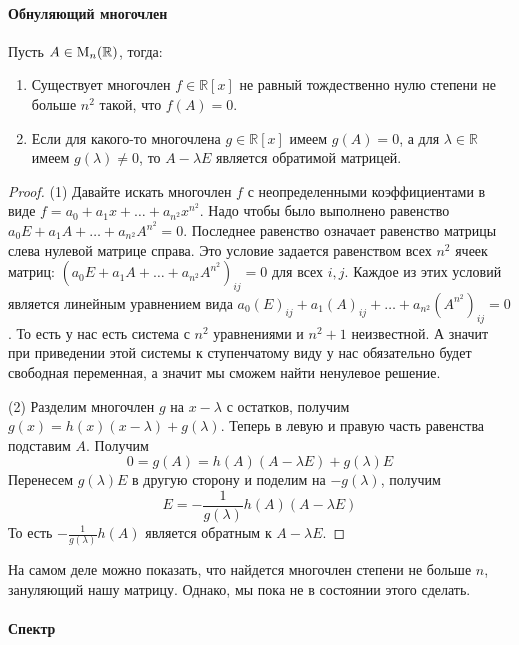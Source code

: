\paragraph{Обнуляющий многочлен}


\begin{claim}\label{claim::PolyAnnihilator}
Пусть $A\in\operatorname{M}_{n}(\mathbb R)$, тогда:
\begin{enumerate}
\item Существует многочлен $f\in\mathbb R[x]$ не равный тождественно нулю степени не больше $n^2$ такой, что $f(A) = 0$.
\item Если для какого-то многочлена $g\in\mathbb R[x]$ имеем $g(A) = 0$, а для $\lambda\in\mathbb R$ имеем $g(\lambda)\neq 0$, то $A-\lambda E$ является обратимой матрицей.
\end{enumerate}
\end{claim}
\begin{proof}
(1) Давайте искать многочлен $f$ с неопределенными коэффициентами в виде $f = a_0 + a_1 x + \ldots + a_{n^2}x^{n^2}$. Надо чтобы было выполнено равенство $a_0 E + a_1 A + \ldots + a_{n^2}A^{n^2} = 0$. Последнее равенство означает равенство матрицы слева нулевой матрице справа. Это условие задается равенством всех $n^2$ ячеек матриц: $(a_0 E + a_1 A + \ldots + a_{n^2}A^{n^2})_{ij} = 0$ для всех $i,j$. Каждое из этих условий является линейным уравнением вида $a_0 (E)_{ij} + a_1 (A)_{ij} + \ldots + a_{n^2}(A^{n^2})_{ij} = 0$. То есть у нас есть система с $n^2$ уравнениями и $n^2 + 1 $ неизвестной. А значит при приведении этой системы к ступенчатому виду у нас обязательно будет свободная переменная, а значит мы сможем найти ненулевое решение.

(2) Разделим многочлен $g$ на $x - \lambda$ с остатков, получим $g(x) = h(x) (x-\lambda) + g(\lambda)$. Теперь в левую и правую часть равенства подставим $A$. Получим 
\[
0 = g(A) = h(A)(A - \lambda E) + g(\lambda)E
\]
Перенесем $g(\lambda)E$ в другую сторону и поделим на $-g(\lambda)$, получим
\[
E = -\frac{1}{g(\lambda)}h(A)(A-\lambda E)
\]
То есть $-\frac{1}{g(\lambda)}h(A)$ является обратным к $A-\lambda E$.
\end{proof}

На самом деле можно показать, что найдется многочлен степени не больше $n$, зануляющий нашу матрицу. Однако, мы пока не в состоянии этого сделать.

\paragraph{Спектр}

